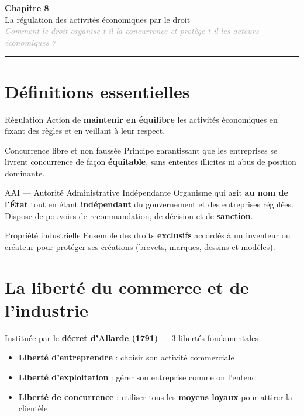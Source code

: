 \documentclass[11pt,a4paper]{article}
\begin{document}
\begin{center}
  {\Large\bfseries\textcolor{mainColor}{Chapitre 8}}\\[2pt]
  {\large La régulation des activités économiques par le droit}\\[4pt]
  \textit{\textcolor{darkGray}{Comment le droit organise-t-il la concurrence et protège-t-il les acteurs économiques ?}}
\end{center}
\vspace{4pt}\hrule\vspace{8pt}

\section*{Définitions essentielles}

\begin{defbox}{Régulation}
Action de \textbf{maintenir en équilibre} les activités économiques en fixant des règles et en veillant à leur respect.
\end{defbox}

\vspace{4pt}
\begin{defbox}{Concurrence libre et non faussée}
Principe garantissant que les entreprises se livrent concurrence de façon \textbf{équitable}, sans ententes illicites ni abus de position dominante.
\end{defbox}

\vspace{4pt}
\begin{defbox}{AAI — Autorité Administrative Indépendante}
Organisme qui agit \textbf{au nom de l'État} tout en étant \textbf{indépendant} du gouvernement et des entreprises régulées. Dispose de pouvoirs de recommandation, de décision et de \textbf{sanction}.
\end{defbox}

\vspace{4pt}
\begin{defbox}{Propriété industrielle}
Ensemble des droits \textbf{exclusifs} accordés à un inventeur ou créateur pour protéger ses créations (brevets, marques, dessins et modèles).
\end{defbox}

\section*{La liberté du commerce et de l'industrie}

\begin{keybox}
Instituée par le \textbf{décret d'Allarde (1791)} — 3 libertés fondamentales :
\end{keybox}
\begin{itemize}
  \item \textbf{Liberté d'entreprendre} : choisir son activité commerciale
  \item \textbf{Liberté d'exploitation} : gérer son entreprise comme on l'entend
  \item \textbf{Liberté de concurrence} : utiliser tous les \textbf{moyens loyaux} pour attirer la clientèle
\end{itemize}
\end{document}
